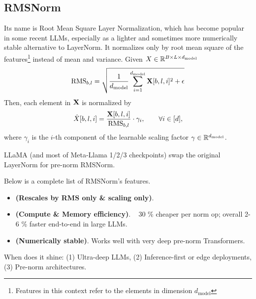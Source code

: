 \documentclass[11pt]{article}  %
\begin{document}
\subsection{RMSNorm}
Its name is Root Mean Square Layer Normalization, which has become popular in some recent LLMs, especially as a lighter and sometimes more numerically stable alternative to LayerNorm.
It normalizes only by root mean square of the features\footnote{Features in this context refer to the elements in dimension $d_{\text{model}}$} instead of mean and variance.
Given $X \in \mathbb{R}^{B \times L \times d_{\text{model}}}$ 
\begin{align*}
  \text{RMS}_{b, l} = \sqrt{\frac{1}{d_{\text{model}}}\sum_{i=1}^{d_{\text{model}}} \mathbf{X}[b, l, i]^2 + \epsilon}
\end{align*}
Then, each element in $\mathbf{X}$ is normalized by 
\begin{align*}
  \hat{X}[b, l, i] = \frac{\mathbf{X}[b, l, i]}{\text{RMS}_{b, l}} \cdot \gamma_i, \qquad \forall i \in [d],
\end{align*}
where $\gamma_i$ is the $i$-th component of the learnable scaling factor $\gamma \in \mathbb{R}^{d_{\text{model}}}$.

LLaMA (and most of Meta-Llama 1/2/3 checkpoints) swap the original LayerNorm for pre-norm RMSNorm.

Below is a complete list of RMSNorm's features.
\begin{itemize}
  \item {\bf (Rescales by RMS only \& scaling only)}.
  \item {\bf (Compute \& Memory efficiency)}. ~ 30 \% cheaper per norm op; overall 2-6 \% faster end-to-end in large LLMs.
  \item {\bf (Numerically stable)}. Works well with very deep pre-norm Transformers.
\end{itemize}
When does it shine: (1) Ultra-deep LLMs, (2) Inference-first or edge deployments, (3) Pre-norm architectures.
\end{document}
